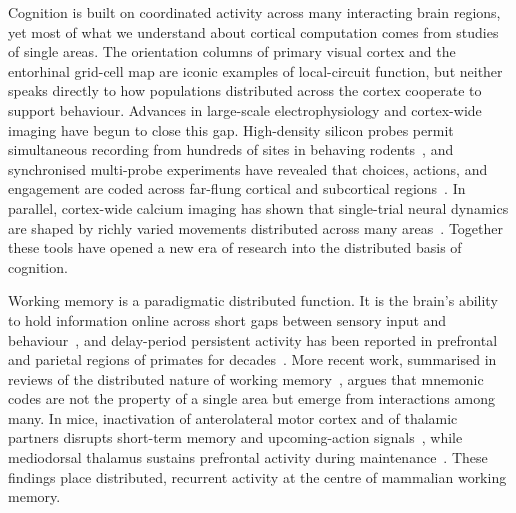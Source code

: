 \documentclass[11pt]{article}
\begin{document}
Cognition is built on coordinated activity across many interacting brain regions, yet most of what we understand about cortical computation comes from studies of single areas. The orientation columns of primary visual cortex and the entorhinal grid-cell map are iconic examples of local-circuit function, but neither speaks directly to how populations distributed across the cortex cooperate to support behaviour. Advances in large-scale electrophysiology and cortex-wide imaging have begun to close this gap. High-density silicon probes permit simultaneous recording from hundreds of sites in behaving rodents~\cite{jun2017neuropixels}, and synchronised multi-probe experiments have revealed that choices, actions, and engagement are coded across far-flung cortical and subcortical regions~\cite{steinmetz2019distributed}. In parallel, cortex-wide calcium imaging has shown that single-trial neural dynamics are shaped by richly varied movements distributed across many areas~\cite{musall2019single,stringer2019spontaneous}. Together these tools have opened a new era of research into the distributed basis of cognition.

Working memory is a paradigmatic distributed function. It is the brain's ability to hold information online across short gaps between sensory input and behaviour~\cite{baddeley2012working}, and delay-period persistent activity has been reported in prefrontal and parietal regions of primates for decades~\cite{funahashi1989mnemonic,goldmanrakic1995cellular}. More recent work, summarised in reviews of the distributed nature of working memory~\cite{christophel2017distributed,leavitt2017sustained}, argues that mnemonic codes are not the property of a single area but emerge from interactions among many. In mice, inactivation of anterolateral motor cortex and of thalamic partners disrupts short-term memory and upcoming-action signals~\cite{guo2017maintenance,inagaki2019discrete,gilad2018behavioral}, while mediodorsal thalamus sustains prefrontal activity during maintenance~\cite{bolkan2017thalamic,schmitt2017thalamic}. These findings place distributed, recurrent activity at the centre of mammalian working memory.
\end{document}
